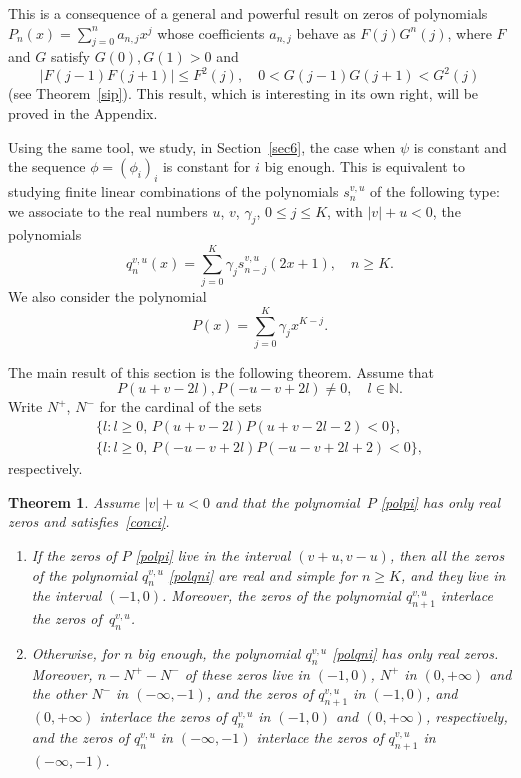 \documentclass[10pt, a4paper, leqno]{amsart}
\numberwithin{equation}{section}
\theoremstyle{plain}
\newtheorem{Theo}{Theorem}[section]
\theoremstyle{remark}
\newcommand{\NN}{\mathbb{N}}
\newcommand{\scvu}{s^{v,u}}
\begin{document}
This is a consequence of a general and powerful result on zeros of polynomials $P_n(x) = \sum_{j=0}^na_{n,j}x^j$ whose coefficients $a_{n,j}$ behave as $F(j)G^n(j)$, where $F$ and $G$ satisfy
$G(0),G(1)>0$ and
\[
  |F(j-1)F(j+1)|\le F^2(j),\quad 0 < G(j-1)G(j+1) < G^2(j)
\]
(see Theorem~\ref{sip}). This result, which is interesting in its own right, will be proved in the Appendix.

Using the same tool, we study, in Section~\ref{sec6}, the case when $\psi$ is constant and the sequence $\phi=(\phi_i)_i$ is constant for $i$ big enough. This is equivalent to studying finite linear combinations of the polynomials $\scvu_n$ of the following type: we associate to the real numbers $u$, $v$, $\gamma_j$, $0\le j\le K$, with $|v|+u<0$, the polynomials
\begin{equation}
\label{polqni}
  q_n^{v,u}(x) = \sum_{j=0}^K\gamma_j\scvu_{n-j}(2x+1),\quad n\ge K.
\end{equation}
We also consider the polynomial
\begin{equation}
\label{polpi}
  P(x) = \sum_{j=0}^K \gamma_jx^{K-j}.
\end{equation}

The main result of this section is the following theorem. Assume that
\begin{equation}
\label{conci}
  P(u+v- 2l),P(-u-v+2l) \ne 0,\quad l\in \NN.
\end{equation}
Write $N^+$, $N^-$ for the cardinal of the sets
\begin{gather*}
  \{l: \text{$l\ge 0$, $P(u+v-2l)P(u+v-2l-2)<0$}\}, \\
  \{l: \text{$l\ge 0$, $P(-u-v+2l)P(-u-v+2l+2)<0$}\},
\end{gather*}
respectively.

\begin{Theo}
\label{th6.3i}
Assume $|v|+u<0$ and that the polynomial~$P$ \eqref{polpi} has only real zeros and satisfies~\eqref{conci}. 
\begin{enumerate}
\item\label{th6.3i-1}
If the zeros of $P$ \eqref{polpi} live in the interval $(v+u,v-u)$, then all the zeros of the polynomial $q_n^{v,u}$ \eqref{polqni} are real and simple for $n\ge K$, and they live in the interval $(-1,0)$. Moreover, the zeros of the polynomial $q_{n+1}^{v,u}$ interlace the zeros of~$q_n^{v,u}$.
\item\label{th6.3i-2}
Otherwise, for $n$ big enough, the polynomial $q_n^{v,u}$ \eqref{polqni} has only real zeros. Moreover, $n-N^+-N^-$ of these zeros live in $(-1,0)$, $N^+$ in $(0,+\infty)$ and the other $N^-$ in $(-\infty,-1)$, and the zeros of $q_{n+1}^{v,u}$ in $(-1,0)$, and $(0,+\infty)$ interlace the zeros of $q_n^{v,u}$ in $(-1,0)$ and $(0,+\infty)$, respectively, and the zeros of $q_{n}^{v,u}$ in $(-\infty,-1)$ interlace the zeros of $q_{n+1}^{v,u}$ in $(-\infty,-1)$.
\end{enumerate}
\end{Theo}
\end{document}
